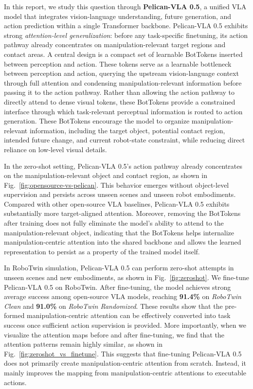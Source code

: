 \documentclass[a4paper,table]{extarticle}
\begin{document}
In this report, we study this question through \textbf{Pelican-VLA 0.5}, a unified VLA model that integrates vision-language understanding, future generation, and action prediction within a single Transformer backbone. Pelican-VLA 0.5 exhibits strong \emph{attention-level generalization}: before any task-specific finetuning, its action pathway already concentrates on manipulation-relevant target regions and contact areas. A central design  is a compact set of learnable BotTokens inserted between perception and action. These tokens serve as a learnable bottleneck between perception and action, querying the upstream vision-language context through full attention and condensing manipulation-relevant information before passing it to the action pathway. Rather than allowing the action pathway to directly attend to dense visual tokens, these BotTokens provide a constrained interface through which task-relevant perceptual information is routed to action generation. These BotTokens encourage the model to organize manipulation-relevant information, including the target object, potential contact region, intended future change, and current robot-state constraint, while reducing direct reliance on low-level visual details. 

In the zero-shot setting, Pelican-VLA 0.5's action pathway already concentrates on the manipulation-relevant object and contact region, as shown in Fig.~\ref{fig:opensource-vs-pelican}. This behavior emerges without object-level supervision and persists across unseen scenes and unseen robot embodiments. Compared with other open-source VLA baselines, Pelican-VLA 0.5 exhibits substantially more target-aligned attention.  Moreover, removing the BotTokens after training does not fully eliminate the model’s ability to attend to the manipulation-relevant object, indicating that the BotTokens helps internalize manipulation-centric attention into the shared backbone and allows the learned representation to persist as a property of the trained model itself.

In RoboTwin simulation, Pelican-VLA 0.5 can perform zero-shot attempts in unseen scenes and new embodiments, as shown in Fig.~\ref{fig:zeroshot}. We fine-tune Pelican-VLA 0.5 on RoboTwin. After fine-tuning, the model achieves strong average success among open-source VLA models, reaching \textbf{91.4\%} on \emph{RoboTwin Clean} and \textbf{91.0\%} on \emph{RoboTwin Randomized}. These results show that the pre-formed manipulation-centric attention can be effectively converted into task success once sufficient action supervision is provided. More importantly, when we visualize the attention maps before and after fine-tuning, we find that the attention patterns remain highly similar, as shown in Fig.~\ref{fig:zeroshot_vs_finetune}. This suggests that fine-tuning Pelican-VLA 0.5 does not primarily create manipulation-centric attention from scratch. Instead, it mainly improves the mapping from manipulation-centric attentions to executable actions.
\end{document}
